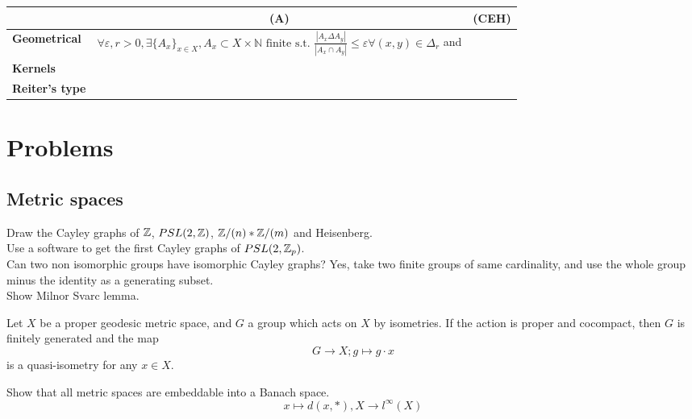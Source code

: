 \begin{table}[h]
\begin{tabular}{c|c|c|}
                                                         & \textbf{(A)}            & \textbf{(CEH)}  \\ \hline
\multicolumn{1}{|l|}{\textbf{Geometrical}}               & $\forall \varepsilon, r>0, \exists \{A_x\}_{x\in X}, A_x\subset X\times \mathbb N \text{ finite s.t. }\frac{|A_x\Delta A_y|}{|A_x\cap A_y|}\leq \varepsilon \forall (x,y)\in \Delta_r$ and &                       \\ \hline
\multicolumn{1}{|l|}{\textbf{Kernels}}                   &                      &                       \\ \hline
\multicolumn{1}{|l|}{\textbf{Reiter's type}}             &                      &                       \\ \hline
\hline
\end{tabular}
\end{table} 

\section{Problems}

\subsection{Metric spaces}
Draw the Cayley graphs of $\mathbb Z$, $PSL(2,\mathbb Z)$, $\mathbb Z / (n) \ast \mathbb Z / (m)$ and Heisenberg.\\

Use a software to get the first Cayley graphs of $PSL(2,\mathbb Z_p)$.\\

Can two non isomorphic groups have isomorphic Cayley graphs? Yes, take two finite groups of same cardinality, and use the whole group minus the identity as a generating subset.\\

Show Milnor Svarc lemma.\\

\begin{thm}
Let $X$ be a proper geodesic metric space, and $G$ a group which acts on $X$ by isometries. If the action is proper and cocompact, then $G$ is finitely generated and the map
\[G \rightarrow X ; g\mapsto g\cdot x\]
is a quasi-isometry for any $x\in X$.
\end{thm}

Show that all metric spaces are embeddable into a Banach space. 
\[x\mapsto d(x, *), X\rightarrow l^\infty (X)\]

